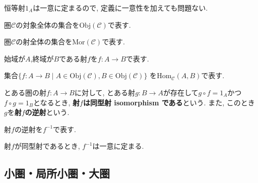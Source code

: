 \begin{caution}
恒等射$1_{A}$は一意に定まるので, 定義に一意性を加えても問題ない.
\end{caution}
\begin{Notation}
圏$\mathscr{C}$の対象全体の集合を$\mathrm{Obj}(\mathscr{C})$で表す.
\end{Notation}
\begin{Notation}
圏$\mathscr{C}$の射全体の集合を$\mathrm{Mor}(\mathscr{C})$で表す.
\end{Notation}

\begin{Notation}
始域が$A$,終域が$B$である射$f$を$f:A\rightarrow B$で表す.
\end{Notation}
\begin{Notation}
集合$\{f:A\rightarrow B\mid A\in\mathrm{Obj}(\mathscr{C}), B\in\mathrm{Obj}(\mathscr{C})\}$
を$\mathrm{Hom}_{\mathscr{C}}(A,B)$で表す.
\end{Notation}
\begin{Def}
とある圏の射$f:A\rightarrow B$に対して,
とある射$g:B\rightarrow A$が存在して$g\circ f=1_A$かつ$f\circ g=1_B$となるとき,
{\bf 射$f$は同型射 isomorphism である}という. また, このとき$g$を{\bf 射$f$の逆射}という.
\end{Def}
\begin{Notation}
射$f$の逆射を$f^{-1}$で表す.
\end{Notation}
\begin{Prop}
射$f$が同型射であるとき, $f^{-1}$は一意に定まる.
\end{Prop}
\begin{comment}
\subsection{情報隠蔽された対象の探究に圏論が提供する方法論}
オブジェクト指向プログラミングでは,「知らせる必要のない情報は隠蔽しておくほうが安全である」という{\bf 情報隠蔽}の考え方が重要視される.
これに対して, 圏論は, 対象がもつ情報が隠蔽されている状況下で, 射のみから対象について探究するという方法論を提供する.
\begin{example}
どのような要素をもつかわからない集合$A$について写像$f:A\rightarrow A$が定義されていて$f\circ f\circ f$が恒等写像になるとする.
このとき$A$が3つの要素$a_1,a_2,a_3$をもつと仮定することができ,
\[
f(a_1)=a_2, f(a_2)=a_3, 
f(a_3)=a_1
\]
というように, これらの要素が写像$f$によって回転していると考えることができる.
\end{example}
\end{comment}
\subsection{小圏・局所小圏・大圏}
